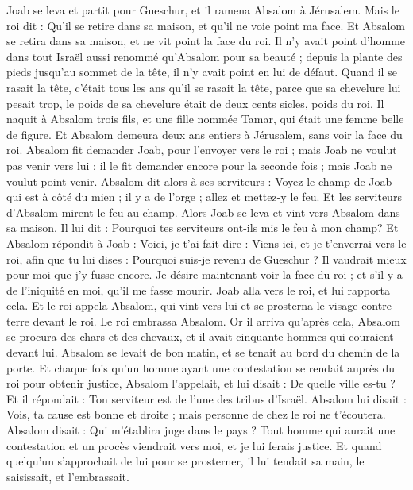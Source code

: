 \begin{multicols}{2}
Joab se leva et partit pour Gueschur, et il ramena Absalom à Jérusalem.
Mais le roi dit : Qu'il se retire dans sa maison, et qu'il ne voie point ma face. Et Absalom se retira dans sa maison, et ne vit point la face du roi.
Il n'y avait point d'homme dans tout Israël aussi renommé qu'Absalom pour sa beauté ; depuis la plante des pieds jusqu'au sommet de la tête, il n'y avait point en lui de défaut.
Quand il se rasait la tête, c’était tous les ans qu’il se rasait la tête, parce que sa chevelure lui pesait trop, le poids de sa chevelure était de deux cents sicles, poids du roi.
Il naquit à Absalom trois fils, et une fille nommée Tamar, qui était une femme belle de figure.
Et Absalom demeura deux ans entiers à Jérusalem, sans voir la face du roi.
Absalom fit demander Joab, pour l'envoyer vers le roi ; mais Joab ne voulut pas venir vers lui ; il le fit demander encore pour la seconde fois ; mais Joab ne voulut point venir.
Absalom dit alors à ses serviteurs : Voyez le champ de Joab qui est à côté du mien ; il y a de l'orge ; allez et mettez-y le feu. Et les serviteurs d'Absalom mirent le feu au champ.
Alors Joab se leva et vint vers Absalom dans sa maison. Il lui dit : Pourquoi tes serviteurs ont-ils mis le feu à mon champ?
Et Absalom répondit à Joab : Voici, je t'ai fait dire : Viens ici, et je t'enverrai vers le roi, afin que tu lui dises : Pourquoi suis-je revenu de Gueschur ? Il vaudrait mieux pour moi que j’y fusse encore. Je désire maintenant voir la face du roi ; et s'il y a de l'iniquité en moi, qu'il me fasse mourir.
Joab alla vers le roi, et lui rapporta cela. Et le roi appela Absalom, qui vint vers lui et se prosterna le visage contre terre devant le roi. Le roi embrassa Absalom.
\VerseOne{}Or il arriva qu’après cela, Absalom se procura des chars et des chevaux, et il avait cinquante hommes qui couraient devant lui.
Absalom se levait de bon matin, et se tenait au bord du chemin de la porte. Et chaque fois qu’un homme ayant une contestation se rendait auprès du roi pour obtenir justice, Absalom l'appelait, et lui disait : De quelle ville es-tu ? Et il répondait : Ton serviteur est de l’une des tribus d'Israël.
Absalom lui disait : Vois, ta cause est bonne et droite ; mais personne de chez le roi ne t’écoutera.
Absalom disait : Qui m’établira juge dans le pays ? Tout homme qui aurait une contestation et un procès viendrait vers moi, et je lui ferais justice.
Et quand quelqu'un s'approchait de lui pour se prosterner, il lui tendait sa main, le saisissait, et l’embrassait.

\end{multicols}
